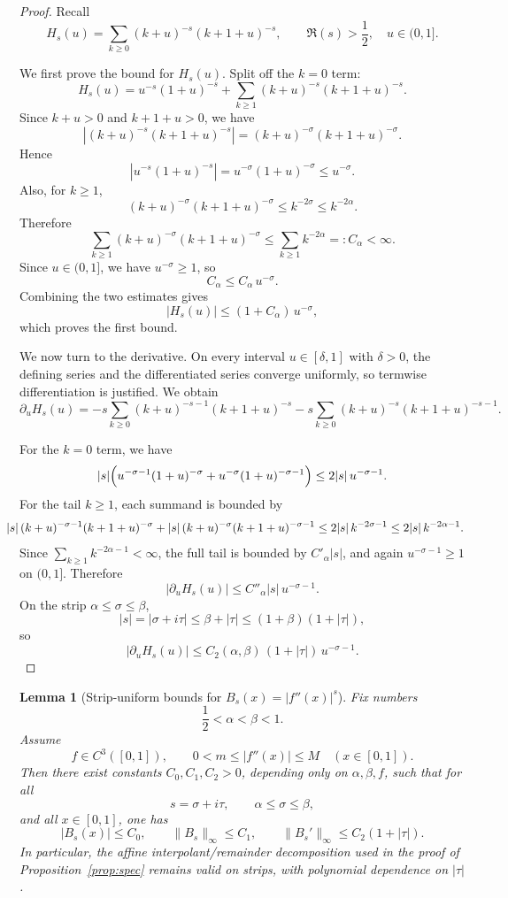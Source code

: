 \documentclass[a4paper,american,11pt]{amsart}
\theoremstyle{plain}
\newtheorem{lemma}[theorem]{Lemma}
\theoremstyle{definition}
\begin{document}
\begin{proof}
Recall
\[
H_s(u)=\sum_{k\ge0}(k+u)^{-s}(k+1+u)^{-s},
\qquad \Re(s)>\frac12,\quad u\in(0,1].
\]

We first prove the bound for \(H_s(u)\). Split off the \(k=0\) term:
\[
H_s(u)=u^{-s}(1+u)^{-s}+\sum_{k\ge1}(k+u)^{-s}(k+1+u)^{-s}.
\]
Since \(k+u>0\) and \(k+1+u>0\), we have
\[
|(k+u)^{-s}(k+1+u)^{-s}|=(k+u)^{-\sigma}(k+1+u)^{-\sigma}.
\]
Hence
\[
|u^{-s}(1+u)^{-s}|
=
u^{-\sigma}(1+u)^{-\sigma}
\le u^{-\sigma}.
\]
Also, for \(k\ge1\),
\[
(k+u)^{-\sigma}(k+1+u)^{-\sigma}\le k^{-2\sigma}\le k^{-2\alpha}.
\]
Therefore
\[
\sum_{k\ge1}(k+u)^{-\sigma}(k+1+u)^{-\sigma}
\le \sum_{k\ge1}k^{-2\alpha}
=:C_\alpha<\infty.
\]
Since \(u\in(0,1]\), we have \(u^{-\sigma}\ge1\), so
\[
C_\alpha\le C_\alpha\,u^{-\sigma}.
\]
Combining the two estimates gives
\[
|H_s(u)|\le (1+C_\alpha)\,u^{-\sigma},
\]
which proves the first bound.

We now turn to the derivative. On every interval \(u\in[\delta,1]\) with \(\delta>0\), the defining
series and the differentiated series converge uniformly, so termwise differentiation is justified.
We obtain
\[
\partial_u H_s(u)
=
-s\sum_{k\ge0}(k+u)^{-s-1}(k+1+u)^{-s}
-s\sum_{k\ge0}(k+u)^{-s}(k+1+u)^{-s-1}.
\]

For the \(k=0\) term, we have
\[
|s|\Bigl(u^{-\sigma-1}(1+u)^{-\sigma}+u^{-\sigma}(1+u)^{-\sigma-1}\Bigr)
\le 2|s|\,u^{-\sigma-1}.
\]
For the tail \(k\ge1\), each summand is bounded by
\[\mkern-22mu
|s|\,(k+u)^{-\sigma-1}(k+1+u)^{-\sigma}
+
|s|\,(k+u)^{-\sigma}(k+1+u)^{-\sigma-1}
\le 2|s|\,k^{-2\sigma-1}\le 2|s|\,k^{-2\alpha-1}.
\]
Since \(\sum_{k\ge1}k^{-2\alpha-1}<\infty\), the full tail is bounded by \(C'_\alpha|s|\), and
again \(u^{-\sigma-1}\ge1\) on \((0,1]\). Therefore
\[
|\partial_u H_s(u)|\le C''_\alpha |s|\,u^{-\sigma-1}.
\]
On the strip \(\alpha\le \sigma\le \beta\),
\[
|s|=|\sigma+i\tau|\le \beta+|\tau|\le (1+\beta)(1+|\tau|),
\]
so
\[
|\partial_u H_s(u)|\le C_2(\alpha,\beta)\,(1+|\tau|)\,u^{-\sigma-1}.
\]
\end{proof}

\begin{lemma}[Strip-uniform bounds for \(B_s(x)=|f''(x)|^s\)]
\label{lem:Bs-strip}
Fix numbers
\[
\frac12<\alpha<\beta<1.
\]
Assume
\[
f\in C^3([0,1]),
\qquad
0<m\le |f''(x)|\le M
\quad (x\in[0,1]).
\]
Then there exist constants \(C_0,C_1,C_2>0\), depending only on \(\alpha,\beta,f\), such that for all
\[
s=\sigma+i\tau,\qquad \alpha\le \sigma\le \beta,
\]
and all \(x\in[0,1]\), one has
\[
|B_s(x)|\le C_0,\qquad \|B_s\|_\infty\le C_1,\qquad \|B_s'\|_\infty\le C_2(1+|\tau|).
\]
In particular, the affine interpolant/remainder decomposition used in the proof of
Proposition~\ref{prop:spec} remains valid on strips, with polynomial dependence on \(|\tau|\).
\end{lemma}
\end{document}
